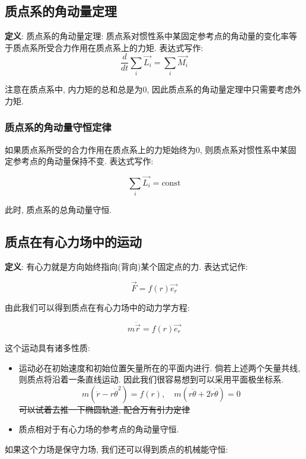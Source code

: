 \documentclass[
  a4paper,
]{ctexrep}
\renewcommand{\st}[1]{\sout{#1}}
\providecommand{\tightlist}{%
  \setlength{\itemsep}{0pt}\setlength{\parskip}{0pt}}
\begin{document}
\subsection{质点系的角动量定理}\label{ux8d28ux70b9ux7cfbux7684ux89d2ux52a8ux91cfux5b9aux7406}

\textbf{定义}: 质点系的角动量定理:
质点系对惯性系中某固定参考点的角动量的变化率等于质点系所受合力作用在质点系上的力矩.
表达式写作: \[\frac{d}{dt} \sum_i \vec{L_i} = \sum_i \vec{M_i}\]

注意在质点系中, 内力矩的总和总是为\(0\),
因此质点系的角动量定理中只需要考虑外力矩.

\subsubsection{质点系的角动量守恒定律}\label{ux8d28ux70b9ux7cfbux7684ux89d2ux52a8ux91cfux5b88ux6052ux5b9aux5f8b}

如果质点系所受的合力作用在质点系上的力矩始终为\(0\),
则质点系对惯性系中某固定参考点的角动量保持不变. 表达式写作:

\[\sum_i \vec{L_i} = \text{const}\]

此时, 质点系的总角动量守恒.

\subsection{质点在有心力场中的运动}\label{ux8d28ux70b9ux5728ux6709ux5fc3ux529bux573aux4e2dux7684ux8fd0ux52a8}

\textbf{定义}: 有心力就是方向始终指向(背向)某个固定点的力. 表达式记作:

\[\vec{F} = f(r) \vec{e_r}\]

由此我们可以得到质点在有心力场中的动力学方程:

\[m \ddot{\vec{r}} = f(r) \vec{e_r}\]

这个运动具有诸多性质:

\begin{itemize}
\tightlist
\item
  运动必在初始速度和初始位置矢量所在的平面内进行. 倘若上述两个矢量共线,
  则质点将沿着一条直线运动. 因此我们很容易想到可以采用平面极坐标系.
  \[ m (\ddot{r} - r \dot{\theta}^2) = f(r), \quad m (r \ddot{\theta} + 2 \dot{r} \dot{\theta}) = 0 \]
  \st{可以试着去推一下椭圆轨道, 配合万有引力定律}
\item
  质点相对于有心力场的参考点的角动量守恒.
\end{itemize}

如果这个力场是保守力场, 我们还可以得到质点的机械能守恒:
\end{document}
